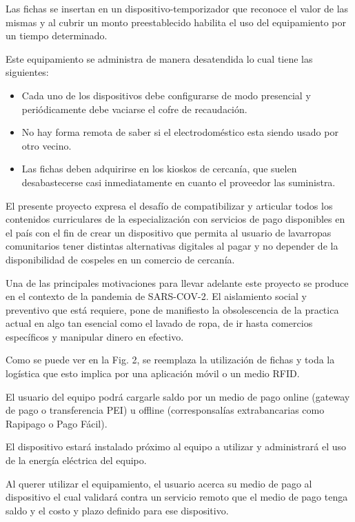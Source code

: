 \documentclass[11pt]{charter}
\begin{document}
Las fichas se insertan en un dispositivo-temporizador que reconoce el valor de las mismas y al cubrir un monto preestablecido habilita el uso del equipamiento por un tiempo determinado. 

Este equipamiento se administra de manera desatendida lo cual tiene las siguientes: 

\begin{itemize}
\item Cada uno de los dispositivos debe configurarse de modo presencial y periódicamente debe vaciarse el cofre de recaudación.

\item No hay forma remota de saber si el electrodoméstico esta siendo usado por otro vecino.
\item Las fichas deben adquirirse en los kioskos de cercanía, que suelen desabastecerse casi inmediatamente en cuanto el proveedor las suministra.
\end{itemize}


El presente proyecto expresa el desafío de compatibilizar y articular todos los contenidos curriculares de la especialización con servicios de pago disponibles en el país con el fin de crear un dispositivo que permita al usuario de lavarropas comunitarios tener distintas alternativas digitales al pagar y no depender de la disponibilidad de cospeles en un comercio de cercanía. 
 

Una de las principales motivaciones para llevar adelante este proyecto se produce en el contexto de la pandemia de SARS-COV-2. El aislamiento social y preventivo que está requiere, pone de manifiesto la obsolescencia de la practica actual en algo tan esencial como el lavado de ropa, de ir hasta comercios específicos y manipular dinero en efectivo.  

Como se puede ver en la Fig. 2, se reemplaza la utilización de fichas y toda la logística que esto implica por una aplicación móvil o un medio RFID.

El usuario del equipo podrá cargarle saldo por un medio de pago online (gateway de pago o transferencia PEI) u offline (corresponsalías extrabancarias como Rapipago o Pago Fácil).

El dispositivo estará instalado próximo al equipo a utilizar y administrará el uso de la energía eléctrica del equipo.

Al querer utilizar el equipamiento, el usuario acerca su medio de pago al dispositivo el cual validará contra un servicio remoto que el medio de pago tenga saldo y el costo y plazo definido para ese dispositivo.
\end{document}
